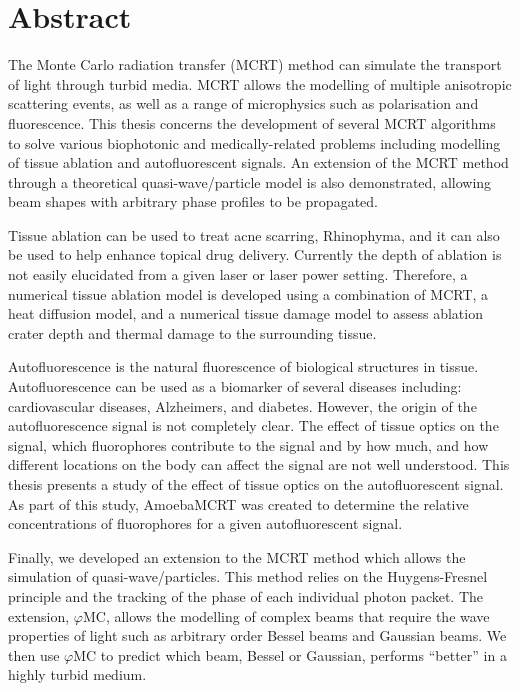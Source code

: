 \documentclass[10pt,a4paper,twoside]{book}
\begin{document}
\chapter{Abstract}
The Monte Carlo radiation transfer (MCRT) method can simulate the transport of light through turbid media.
MCRT allows the modelling of multiple anisotropic scattering events, as well as a range of microphysics such as polarisation and fluorescence.
This thesis concerns the development of several MCRT algorithms to solve various biophotonic and medically-related problems including modelling of tissue ablation and autofluorescent signals.
An extension of the MCRT method through a theoretical quasi-wave/particle model is also demonstrated, allowing beam shapes with arbitrary phase profiles to be propagated.

Tissue ablation can be used to treat acne scarring, Rhinophyma, and it can also be used to help enhance topical drug delivery.
Currently the depth of ablation is not easily elucidated from a given laser or laser power setting.
Therefore, a numerical tissue ablation model is developed using a combination of MCRT, a heat diffusion model, and a numerical tissue damage model to assess ablation crater depth and thermal damage to the surrounding tissue.

Autofluorescence is the natural fluorescence of biological structures in tissue.
Autofluorescence can be used as a biomarker of several diseases including: cardiovascular diseases, Alzheimers, and diabetes.
However, the origin of the autofluorescence signal is not completely clear.
The effect of tissue optics on the signal, which fluorophores contribute to the signal and by how much, and how different locations on the body can affect the signal are not well understood.
This thesis presents a study of the effect of tissue optics on the autofluorescent signal.
As part of this study, AmoebaMCRT was created to determine the relative concentrations of fluorophores for a given autofluorescent signal.

Finally, we developed an extension to the MCRT method which allows the simulation of quasi-wave/particles.
This method relies on the Huygens-Fresnel principle and the tracking of the phase of each individual photon packet.
The extension, $\varphi$MC, allows the modelling of complex beams that require the wave properties of light such as arbitrary order Bessel beams and Gaussian beams.
We then use $\varphi$MC to predict which beam, Bessel or Gaussian, performs ``better'' in a highly turbid medium.
\end{document}
